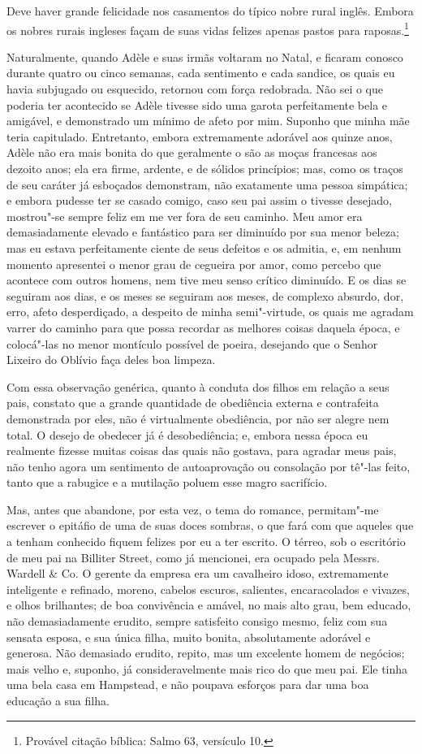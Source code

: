 Deve haver grande felicidade nos casamentos do típico nobre rural
inglês. Embora os nobres rurais ingleses façam de suas vidas felizes
apenas pastos para raposas.\footnote{Provável citação bíblica: Salmo 63,
  versículo 10.}

Naturalmente, quando Adèle e suas irmãs voltaram no Natal, e
ficaram conosco durante quatro ou cinco semanas, cada sentimento e cada
sandice, os quais eu havia subjugado ou esquecido, retornou com força
redobrada. Não sei o que poderia ter acontecido se Adèle tivesse sido
uma garota perfeitamente bela e amigável, e demonstrado um mínimo de
afeto por mim. Suponho que minha mãe teria capitulado. Entretanto,
embora extremamente adorável aos quinze anos, Adèle não era mais bonita
do que geralmente o são as moças francesas aos dezoito anos; ela era
firme, ardente, e de sólidos princípios; mas, como os traços de seu
caráter já esboçados demonstram, não exatamente uma pessoa simpática; e
embora pudesse ter se casado comigo, caso seu pai assim o tivesse
desejado, mostrou"-se sempre feliz em me ver fora de seu caminho. Meu
amor era demasiadamente elevado e fantástico para ser diminuído por sua
menor beleza; mas eu estava perfeitamente ciente de seus defeitos e os
admitia, e, em nenhum momento apresentei o menor grau de cegueira por
amor, como percebo que acontece com outros homens, nem tive meu senso
crítico diminuído. E os dias se seguiram aos dias, e os meses se
seguiram aos meses, de complexo absurdo, dor, erro, afeto desperdiçado,
a despeito de minha semi"-virtude, os quais me agradam varrer do caminho
para que possa recordar as melhores coisas daquela época, e colocá"-las
no menor montículo possível de poeira, desejando que o Senhor Lixeiro do
Oblívio faça deles boa limpeza.

Com essa observação genérica, quanto à conduta dos filhos em relação a
seus pais, constato que a grande quantidade de obediência externa e
contrafeita demonstrada por eles, não é virtualmente obediência, por não
ser alegre nem total. O desejo de obedecer já é desobediência; e,
embora nessa época eu realmente fizesse muitas coisas das quais não
gostava, para agradar meus pais, não tenho agora um sentimento de
autoaprovação ou consolação por tê"-las feito, tanto que a rabugice e a
mutilação poluem esse magro sacrifício.

Mas, antes que abandone, por esta vez, o tema do romance,
permitam"-me escrever o epitáfio de uma de suas doces sombras, o que fará
com que aqueles que a tenham conhecido fiquem felizes por eu a ter
escrito. O térreo, sob o escritório de meu pai na Billiter Street, como
já mencionei, era ocupado pela Messrs.\,Wardell \& Co. O gerente da
empresa era um cavalheiro idoso, extremamente inteligente e refinado,
moreno, cabelos escuros, salientes, encaracolados e vivazes, e olhos
brilhantes; de boa convivência e amável, no mais alto grau, bem educado,
não demasiadamente erudito, sempre satisfeito consigo mesmo, feliz com
sua sensata esposa, e sua única filha, muito bonita, absolutamente
adorável e generosa. Não demasiado erudito, repito, mas um excelente
homem de negócios; mais velho e, suponho, já consideravelmente mais rico
do que meu pai. Ele tinha uma bela casa em Hampstead, e não poupava
esforços para dar uma boa educação a sua filha.

